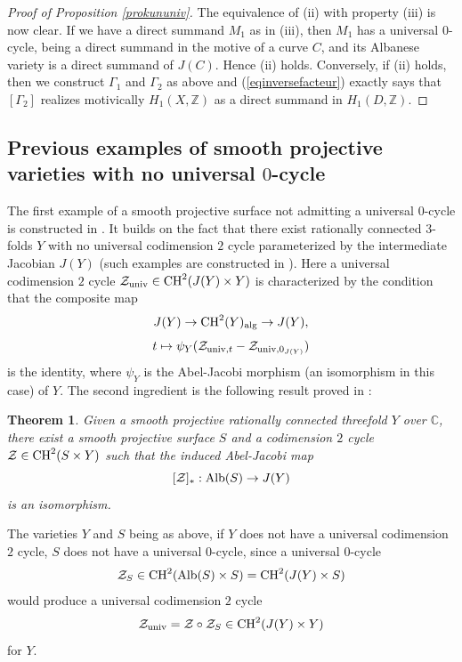\documentclass[10pt]{article}
\newtheorem{theo}{Theorem}[section]
\begin{document}
\begin{proof}[Proof of Proposition \ref{prokununiv}]
The equivalence of  (ii) with property (iii) is  now clear. If we have a direct summand $M_1$ as in (iii), then $M_1$ has a universal $0$-cycle, being a direct summand in the motive of a curve $C$, and its Albanese variety is a direct summand of $J(C)$. Hence (ii) holds. Conversely, if (ii) holds, then we construct $\Gamma_1$ and $\Gamma_2$ as above and (\ref{eqinversefacteur}) exactly says that $[\Gamma_2]$ realizes motivically  $H_1(X,\mathbb{Z})$ as a direct summand in $H_1(D,\mathbb{Z})$.
\end{proof}




\subsection{Previous examples of smooth projective varieties with no universal $0$-cycle}
The first example of a smooth projective surface not admitting a universal $0$-cycle is constructed in \cite{voisincollino}. It builds on the fact that there exist rationally connected $3$-folds $Y$ with no universal codimension $2$ cycle parameterized by the intermediate Jacobian $J(Y)$ (such examples are constructed in \cite{voisinINVENT}). Here a universal codimension $2$ cycle $\mathcal{Z}_{\rm univ}\in{\rm CH}^2(J(Y)\times Y)$ is characterized by the condition that the composite map
$$J(Y)\rightarrow {\rm CH}^2(Y)_{\rm alg}\rightarrow  J(Y),$$
$$t\mapsto \psi_Y(\mathcal{Z}_{{\rm univ},t}- \mathcal{Z}_{{\rm univ},0_{J(Y)}})$$
is the identity, where $\psi_Y$ is the Abel-Jacobi morphism (an isomorphism in this case) of $Y$.
The second ingredient is the following result proved in \cite{voisincollino}:
\begin{theo} \label{theocollino} Given a smooth projective  rationally connected threefold $Y$ over $\mathbb{C}$, there exist a smooth projective surface $S$ and a codimension $2$ cycle $\mathcal{Z}\in  {\rm CH}^2(S\times Y)$ such that the induced Abel-Jacobi map
$$[\mathcal{Z}]_*: {\rm Alb}(S)\rightarrow J(Y)$$
is an isomorphism.
\end{theo}
The varieties $Y$ and $S$ being as above, if $Y$ does not have a universal codimension $2$ cycle, $S$ does not have a universal $0$-cycle, since a universal $0$-cycle $$\mathcal{Z}_S\in {\rm CH}^2({\rm Alb}(S)\times S)={\rm CH}^2(J(Y)\times S)$$ would produce a universal codimension $2$ cycle $$\mathcal{Z}_{\rm univ}=\mathcal{Z}\circ \mathcal{Z}_S\in{\rm CH}^2(J(Y)\times Y)$$
for $Y$.
\end{document}
